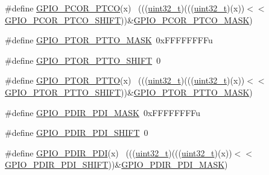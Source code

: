 \begin{DoxyCompactItemize}
\item 
\#define \hyperlink{group___g_p_i_o___register___masks_ga3435ac6150be0f65562e575f41463272}{G\+P\+I\+O\+\_\+\+P\+C\+O\+R\+\_\+\+P\+T\+CO}(x)                                            ~(((\hyperlink{_p_e___types_8h_a33594304e786b158f3fb30289278f5af}{uint32\+\_\+t})(((\hyperlink{_p_e___types_8h_a33594304e786b158f3fb30289278f5af}{uint32\+\_\+t})(x))$<$$<$\hyperlink{group___g_p_i_o___register___masks_ga5c9203b830cbd86cd8d0189872b5c772}{G\+P\+I\+O\+\_\+\+P\+C\+O\+R\+\_\+\+P\+T\+C\+O\+\_\+\+S\+H\+I\+FT}))\&\hyperlink{group___g_p_i_o___register___masks_ga0b8378768ee61ea2c685a1687c90fa03}{G\+P\+I\+O\+\_\+\+P\+C\+O\+R\+\_\+\+P\+T\+C\+O\+\_\+\+M\+A\+SK})
\item 
\#define \hyperlink{group___g_p_i_o___register___masks_gaa75953b5d9d23bdaa6c24232e1a52680}{G\+P\+I\+O\+\_\+\+P\+T\+O\+R\+\_\+\+P\+T\+T\+O\+\_\+\+M\+A\+SK}~0x\+F\+F\+F\+F\+F\+F\+F\+Fu
\item 
\#define \hyperlink{group___g_p_i_o___register___masks_ga70e5442b3a119665aafb9e6e5b48bbd5}{G\+P\+I\+O\+\_\+\+P\+T\+O\+R\+\_\+\+P\+T\+T\+O\+\_\+\+S\+H\+I\+FT}~0
\item 
\#define \hyperlink{group___g_p_i_o___register___masks_gad89d527b4c87f933192b313f79f96438}{G\+P\+I\+O\+\_\+\+P\+T\+O\+R\+\_\+\+P\+T\+TO}(x)                                            ~(((\hyperlink{_p_e___types_8h_a33594304e786b158f3fb30289278f5af}{uint32\+\_\+t})(((\hyperlink{_p_e___types_8h_a33594304e786b158f3fb30289278f5af}{uint32\+\_\+t})(x))$<$$<$\hyperlink{group___g_p_i_o___register___masks_ga70e5442b3a119665aafb9e6e5b48bbd5}{G\+P\+I\+O\+\_\+\+P\+T\+O\+R\+\_\+\+P\+T\+T\+O\+\_\+\+S\+H\+I\+FT}))\&\hyperlink{group___g_p_i_o___register___masks_gaa75953b5d9d23bdaa6c24232e1a52680}{G\+P\+I\+O\+\_\+\+P\+T\+O\+R\+\_\+\+P\+T\+T\+O\+\_\+\+M\+A\+SK})
\item 
\#define \hyperlink{group___g_p_i_o___register___masks_gacb7c8cc976937906c8e803811a7fbb68}{G\+P\+I\+O\+\_\+\+P\+D\+I\+R\+\_\+\+P\+D\+I\+\_\+\+M\+A\+SK}~0x\+F\+F\+F\+F\+F\+F\+F\+Fu
\item 
\#define \hyperlink{group___g_p_i_o___register___masks_ga99fd9212dd769bb1964a28a864c6c741}{G\+P\+I\+O\+\_\+\+P\+D\+I\+R\+\_\+\+P\+D\+I\+\_\+\+S\+H\+I\+FT}~0
\item 
\#define \hyperlink{group___g_p_i_o___register___masks_ga51ee39b660f7d6b95d1348601346dd0d}{G\+P\+I\+O\+\_\+\+P\+D\+I\+R\+\_\+\+P\+DI}(x)                                              ~(((\hyperlink{_p_e___types_8h_a33594304e786b158f3fb30289278f5af}{uint32\+\_\+t})(((\hyperlink{_p_e___types_8h_a33594304e786b158f3fb30289278f5af}{uint32\+\_\+t})(x))$<$$<$\hyperlink{group___g_p_i_o___register___masks_ga99fd9212dd769bb1964a28a864c6c741}{G\+P\+I\+O\+\_\+\+P\+D\+I\+R\+\_\+\+P\+D\+I\+\_\+\+S\+H\+I\+FT}))\&\hyperlink{group___g_p_i_o___register___masks_gacb7c8cc976937906c8e803811a7fbb68}{G\+P\+I\+O\+\_\+\+P\+D\+I\+R\+\_\+\+P\+D\+I\+\_\+\+M\+A\+SK})
$$
\end{DoxyCompactItemize}
